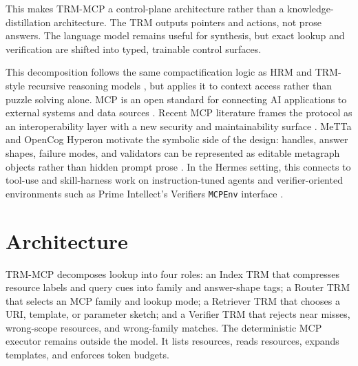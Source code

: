 \documentclass[11pt]{article}
\begin{document}
This makes TRM-MCP a control-plane architecture rather than a knowledge-distillation architecture. The TRM outputs pointers and actions, not prose answers. The language model remains useful for synthesis, but exact lookup and verification are shifted into typed, trainable control surfaces.

This decomposition follows the same compactification logic as HRM and TRM-style recursive reasoning models \citep{wang2025hrm,jolicoeurmartineau2025trm}, but applies it to context access rather than puzzle solving alone. MCP is an open standard for connecting AI applications to external systems and data sources \citep{modelcontextprotocol2026docs}. Recent MCP literature frames the protocol as an interoperability layer with a new security and maintainability surface \citep{hou2025mcplandscape,hasan2025mcpfirstglance,huang2026mcpthreat}. MeTTa and OpenCog Hyperon motivate the symbolic side of the design: handles, answer shapes, failure modes, and validators can be represented as editable metagraph objects rather than hidden prompt prose \citep{goertzel2021metta,meredith2023metametta}. In the Hermes setting, this connects to tool-use and skill-harness work on instruction-tuned agents \citep{teknium2024hermes3} and verifier-oriented environments such as Prime Intellect's Verifiers \texttt{MCPEnv} interface \citep{primeintellect2026verifiers}.

\section{Architecture}

TRM-MCP decomposes lookup into four roles: an Index TRM that compresses resource labels and query cues into family and answer-shape tags; a Router TRM that selects an MCP family and lookup mode; a Retriever TRM that chooses a URI, template, or parameter sketch; and a Verifier TRM that rejects near misses, wrong-scope resources, and wrong-family matches. The deterministic MCP executor remains outside the model. It lists resources, reads resources, expands templates, and enforces token budgets.
\end{document}
